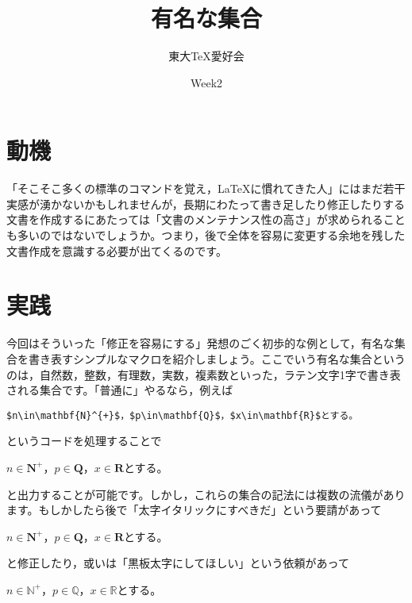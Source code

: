 \documentclass[autodetect-engine,dvipdfmx]{jsarticle}
\title{有名な集合}
\author{東大TeX愛好会}
\date{Week2}
\begin{document}
\maketitle

\part{動機}

「そこそこ多くの標準のコマンドを覚え，\LaTeX に慣れてきた人」にはまだ若干実感が湧かないかもしれませんが，長期にわたって書き足したり修正したりする文書を作成するにあたっては「文書のメンテナンス性の高さ」が求められることも多いのではないでしょうか。つまり，後で全体を容易に変更する余地を残した文書作成を意識する必要が出てくるのです。

\part{実践}

今回はそういった「修正を容易にする」発想のごく初歩的な例として，有名な集合を書き表すシンプルなマクロを紹介しましょう。ここでいう有名な集合というのは，自然数，整数，有理数，実数，複素数といった，ラテン文字1字で書き表される集合です。「普通に」やるなら，例えば

\begin{tcolorbox}

\begin{verbatim}
$n\in\mathbf{N}^{+}$，$p\in\mathbf{Q}$，$x\in\mathbf{R}$とする。
\end{verbatim}

\end{tcolorbox}

というコードを処理することで

\begin{tcolorbox}
$n\in\mathbf{N}^{+}$，$p\in\mathbf{Q}$，$x\in\mathbf{R}$とする。
\end{tcolorbox}

と出力することが可能です。しかし，これらの集合の記法には複数の流儀があります。もしかしたら後で「太字イタリックにすべきだ」という要請があって

\begin{tcolorbox}
$n\in\bm{N}^{+}$，$p\in\bm{Q}$，$x\in\bm{R}$とする。
\end{tcolorbox}

と修正したり，或いは「黒板太字にしてほしい」という依頼があって

\begin{tcolorbox}
$n\in\mathbb{N}^{+}$，$p\in\mathbb{Q}$，$x\in\mathbb{R}$とする。
\end{tcolorbox}
\end{document}
